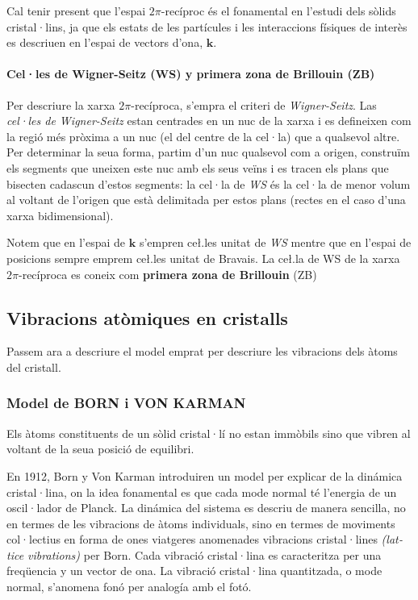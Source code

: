 \documentclass[12pt]{article} %
\let\vec\mathbf %
\begin{document}
{Cal tenir present que l'espai $2\pi$-recíproc és el fonamental en l'estudi dels sòlids cristal·lins, ja que els estats de les partícules i les interaccions físiques de interès es descriuen en l'espai de vectors d'ona, $\vec k$.


\paragraph{Cel·les de Wigner-Seitz (WS) y primera zona de Brillouin (ZB)}

Per descriure la xarxa $2\pi$-recíproca, s'empra el criteri de \textit{Wigner-Seitz}. Las \textit{cel·les de Wigner-Seitz} estan centrades en un nuc de la xarxa i es defineixen com la regió més pròxima a un nuc (el del centre de la cel·la) que a qualsevol altre. Per determinar la seua forma, partim d'un nuc qualsevol com a origen, construïm els segments que uneixen este nuc amb els seus veïns i es tracen els plans que bisecten cadascun d'estos segments: la cel·la de \emph{WS} és la cel·la de menor volum al voltant de l'origen que està delimitada per estos plans (rectes en el caso d'una xarxa bidimensional).

Notem que en l'espai de $\vec k$ s'empren ce\l.les unitat de \emph{WS} mentre que en l'espai de posicions sempre emprem ce\l.les unitat de Bravais.
La ce\l.la de WS de la xarxa $2\pi$-recíproca es coneix com \textbf{primera zona de Brillouin} (ZB)


\subsection{Vibracions atòmiques en cristalls}
Passem ara a descriure el model emprat per descriure les vibracions dels àtoms del cristall.
\subsubsection{Model de BORN i VON KARMAN}
Els àtoms constituents de un sòlid cristal·lí no estan immòbils sino que vibren al voltant de la seua posició de equilibri.

En 1912, Born y Von Karman \cite{Born:1912:SRG} introduiren un model per explicar de la dinámica cristal·lina, on la idea fonamental es que cada mode normal té l'energia de un oscil·lador de Planck. La dinámica del sistema es descriu de manera sencilla, no en termes de les vibracions de àtoms individuals, sino en termes de moviments col·lectius en forma de ones viatgeres anomenades vibracions cristal·lines \emph{(\foreignlanguage{english}{lattice vibrations})} per Born. Cada vibració cristal·lina es caracteritza per una freqüencia y un vector de ona.
La vibració cristal·lina quantitzada, o mode normal, s'anomena fonó per analogía amb el fotó. %

}
\end{document}
